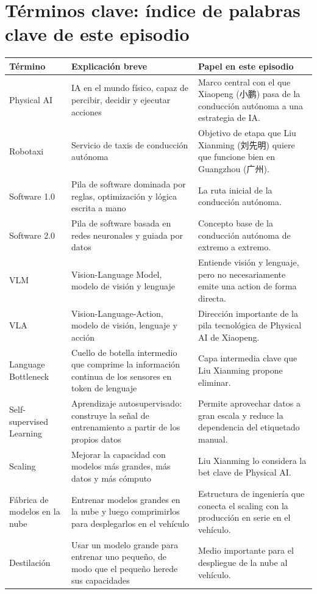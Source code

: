 \documentclass[a4paper]{article}
\begin{document}
\section{Términos clave: índice de palabras clave de este episodio}

\begin{longtable}{p{}p{}p{}}
\toprule
Término & Explicación breve & Papel en este episodio \\
\midrule
Physical AI & IA en el mundo físico, capaz de percibir, decidir y ejecutar acciones & Marco central con el que Xiaopeng (小鹏) pasa de la conducción autónoma a una estrategia de IA. \\
Robotaxi & Servicio de taxis de conducción autónoma & Objetivo de etapa que Liu Xianming (刘先明) quiere que funcione bien en Guangzhou (广州). \\
Software 1.0 & Pila de software dominada por reglas, optimización y lógica escrita a mano & La ruta inicial de la conducción autónoma. \\
Software 2.0 & Pila de software basada en redes neuronales y guiada por datos & Concepto base de la conducción autónoma de extremo a extremo. \\
VLM & Vision-Language Model, modelo de visión y lenguaje & Entiende visión y lenguaje, pero no necesariamente emite una action de forma directa. \\
VLA & Vision-Language-Action, modelo de visión, lenguaje y acción & Dirección importante de la pila tecnológica de Physical AI de Xiaopeng. \\
Language Bottleneck & Cuello de botella intermedio que comprime la información continua de los sensores en token de lenguaje & Capa intermedia clave que Liu Xianming propone eliminar. \\
Self-supervised Learning & Aprendizaje autosupervisado: construye la señal de entrenamiento a partir de los propios datos & Permite aprovechar datos a gran escala y reduce la dependencia del etiquetado manual. \\
Scaling & Mejorar la capacidad con modelos más grandes, más datos y más cómputo & Liu Xianming lo considera la bet clave de Physical AI. \\
Fábrica de modelos en la nube & Entrenar modelos grandes en la nube y luego comprimirlos para desplegarlos en el vehículo & Estructura de ingeniería que conecta el scaling con la producción en serie en el vehículo. \\
Destilación & Usar un modelo grande para entrenar uno pequeño, de modo que el pequeño herede sus capacidades & Medio importante para el despliegue de la nube al vehículo. \\

\end{longtable}
\end{document}
